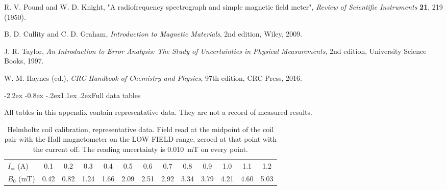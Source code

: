 \documentclass[11pt,a4paper]{article}
\makeatletter
\renewcommand\section{\@startsection{section}{1}{\z@}%
  {-2.2ex \@plus -0.8ex \@minus -.2ex}{1.1ex \@plus .2ex}{\normalfont\large\bfseries}}
\makeatother
\begin{document}
\begin{thebibliography}{99}
 R. V. Pound and W. D. Knight, "A radiofrequency spectrograph and simple magnetic
field meter", \textit{Review of Scientific Instruments} \textbf{21}, 219 (1950).

 B. D. Cullity and C. D. Graham, \textit{Introduction to Magnetic Materials}, 2nd
edition, Wiley, 2009.

 J. R. Taylor, \textit{An Introduction to Error Analysis: The Study of
Uncertainties in Physical Measurements}, 2nd edition, University Science Books, 1997.

 W. M. Haynes (ed.), \textit{CRC Handbook of Chemistry and Physics}, 97th edition,
CRC Press, 2016.

\end{thebibliography}

\appendix
\setcounter{table}{0}
\section{Full data tables}
\label{app:data}

All tables in this appendix contain representative data. They are not a record of measured
results.

\begin{table}[H]
\centering
\caption{Helmholtz coil calibration, representative data. Field read at the midpoint of the coil pair
with the Hall magnetometer on the LOW FIELD range, zeroed at that point with the current off. The
reading uncertainty is \SI{0.010}{\milli\tesla} on every point.}
\label{tab:a1}
\footnotesize
\setlength{\tabcolsep}{4pt}
\begin{tabular}{lcccccccccccc}
\toprule
$I_=$ (\si{\ampere}) & 0.1 & 0.2 & 0.3 & 0.4 & 0.5 & 0.6 & 0.7 & 0.8 & 0.9 & 1.0 & 1.1 & 1.2 \\
$B_0$ (\si{\milli\tesla}) & 0.42 & 0.82 & 1.24 & 1.66 & 2.09 & 2.51 & 2.92 & 3.34 & 3.79 & 4.21 & 4.60 & 5.03 \\
\bottomrule
\end{tabular}
\end{table}
\end{document}
